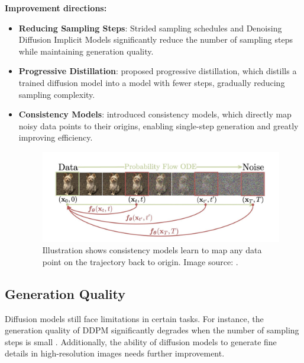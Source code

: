 \documentclass[sigconf,natbib=false]{acmart}
\begin{document}
\textbf{Improvement directions:}
\begin{itemize}
  \item \textbf{Reducing Sampling Steps}:
  Strided sampling schedules \cite[Nichol \& Dhariwal (2021)]{nichol2021}
  and Denoising Diffusion Implicit Models \cite[DDIM; Song et al. (2022)]{song2022}
  significantly reduce the number of sampling steps while maintaining generation quality.
  \item \textbf{Progressive Distillation}:
  \cite[Salimans \& Ho (2022)]{salimans2022} proposed progressive distillation,
  which distills a trained diffusion model into a model with fewer steps,
  gradually reducing sampling complexity.
  \item \textbf{Consistency Models}:
  \cite[Song et al. (2023)]{song2023} introduced consistency models,
  which directly map noisy data points to their origins,
  enabling single-step generation and greatly improving efficiency.
  \begin{figure}[h]
    \centering
    \includegraphics[width=\linewidth]{imgs/230301469-F1.png}
    \caption{Illustration shows consistency models learn to map any data point on the trajectory back to origin.
    Image source: \cite[Song et al. (2023)]{song2023}.}
    \Description{}
  \end{figure}
\end{itemize}

\subsection{Generation Quality}
Diffusion models still face limitations in certain tasks.
For instance, the generation quality of DDPM significantly degrades
when the number of sampling steps is small \cite[Song et al. (2022)]{song2022}.
Additionally, the ability of diffusion models to generate fine details
in high-resolution images needs further improvement.
\end{document}
